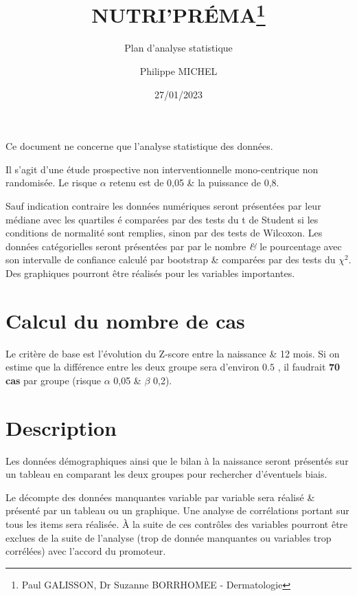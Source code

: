 \documentclass[
  a4paperpaper,
  french]{scrartcl}
\title{NUTRI'PRÉMA\thanks{Paul GALISSON, Dr Suzanne BORRHOMEE -
Dermatologie}}
\subtitle{Plan d'analyse statistique}
\author{Philippe MICHEL}
\date{27/01/2023}
\begin{document}
\maketitle
\ifdefined\Shaded\renewenvironment{Shaded}{\begin{tcolorbox}[sharp corners, boxrule=0pt, enhanced, interior hidden, breakable, borderline west={3pt}{0pt}{shadecolor}, frame hidden]}{\end{tcolorbox}}\fi

Ce document ne concerne que l'analyse statistique des données.

Il s'agit d'une étude prospective non interventionnelle mono-centrique
non randomisée. Le risque \(\alpha\) retenu est de 0,05 \& la puissance
de 0,8.

Sauf indication contraire les données numériques seront présentées par
leur médiane avec les quartiles é comparées par des tests du t de
Student si les conditions de normalité sont remplies, sinon par des
tests de Wilcoxon. Les données catégorielles seront présentées par par
le nombre \emph{\&} le pourcentage avec son intervalle de confiance
calculé par bootstrap \& comparées par des tests du \(\chi^2\). Des
graphiques pourront être réalisés pour les variables importantes.

\hypertarget{calcul-du-nombre-de-cas}{%
\section{Calcul du nombre de cas}\label{calcul-du-nombre-de-cas}}

Le critère de base est l'évolution du Z-score entre la naissance \& 12
mois. Si on estime que la différence entre les deux groupe sera
d'environ \(\num{0.5}\) , il faudrait \textbf{70 cas} par groupe (risque
\(\alpha\) 0,05 \& \(\beta\) 0,2).

\hypertarget{description}{%
\section{Description}\label{description}}

Les données démographiques ainsi que le bilan à la naissance seront
présentés sur un tableau en comparant les deux groupes pour rechercher
d'éventuels biais.

Le décompte des données manquantes variable par variable sera réalisé \&
présenté par un tableau ou un graphique. Une analyse de corrélations
portant sur tous les items sera réalisée. À la suite de ces contrôles
des variables pourront être exclues de la suite de l'analyse (trop de
donnée manquantes ou variables trop corrélées) avec l'accord du
promoteur.
\end{document}

